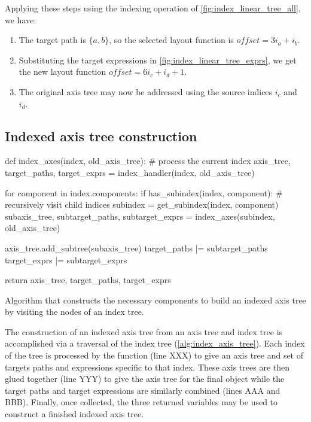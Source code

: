 \documentclass[thesis]{subfiles}
\begin{document}
Applying these steps using the indexing operation of \cref{fig:index_linear_tree_all}, we have:

\begin{enumerate}
  \item
    The target path is $\{a, b\}$, so the selected layout function is $\mathit{offset} = 3 i_a + i_b$.
  \item
    Substituting the target expressions in \cref{fig:index_linear_tree_exprs}, we get the new layout function $\mathit{offset} = 6 i_c + i_d + 1$.
  \item
    The original axis tree may now be addressed using the source indices $i_c$ and $i_d$.
\end{enumerate}

\subsection{Indexed axis tree construction}

\begin{algorithm}
  \begin{pyalg}
    def index_axes(index, old_axis_tree):
      # process the current index
      axis_tree, target_paths, target_exprs = index_handler(index, old_axis_tree)

      for component in index.components:
        if has_subindex(index, component):
          # recursively visit child indices
          subindex = get_subindex(index, component)
          subaxis_tree, subtarget_paths, subtarget_exprs = index_axes(subindex, old_axis_tree)

          axis_tree.add_subtree(subaxis_tree)
          target_paths |= subtarget_paths
          target_exprs |= subtarget_exprs

      return axis_tree, target_paths, target_exprs
  \end{pyalg}

  \caption{
    Algorithm that constructs the necessary components to build an indexed axis tree by visiting the nodes of an index tree.
  }
  \label{alg:index_axis_tree}
\end{algorithm}

The construction of an indexed axis tree from an axis tree and index tree is accomplished via a traversal of the index tree (\cref{alg:index_axis_tree}).
Each index of the tree is processed by the function  (line XXX) to give an axis tree and set of targets paths and expressions specific to that index.
These axis trees are then glued together (line YYY) to give the axis tree for the final object while the target paths and target expressions are similarly combined (lines AAA and BBB).
Finally, once collected, the three returned variables may be used to construct a finished indexed axis tree.
\end{document}
